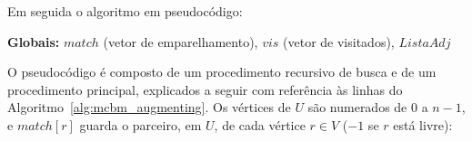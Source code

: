 Em seguida o algoritmo em pseudocódigo:

\begin{algorithm}[H]
    \DontPrintSemicolon
    \SetAlgoLined

    \textbf{Globais:} $match$ (vetor de emparelhamento), $vis$ (vetor de visitados), $ListaAdj$\;
    \bigskip


    \bigskip

    
    \caption{Algoritmo de caminhos aumentantes (MCBM) \cite{halim}}
    \label{alg:mcbm_augmenting}
\end{algorithm}

O pseudocódigo é composto de um procedimento recursivo de busca e de um procedimento principal, explicados a seguir com referência às linhas do Algoritmo~\ref{alg:mcbm_augmenting}. Os vértices de $U$ são numerados de $0$ a $n-1$, e $match[r]$ guarda o parceiro, em $U$, de cada vértice $r \in V$ ($-1$ se $r$ está livre):

